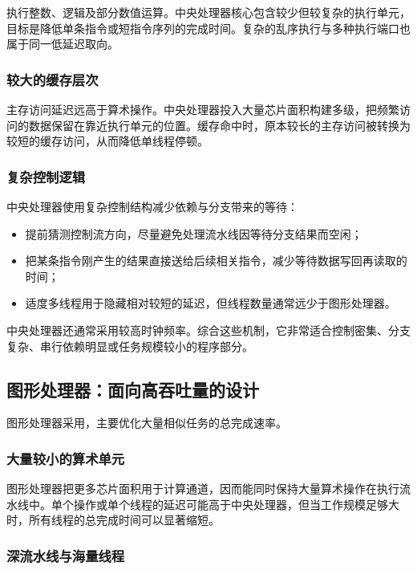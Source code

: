 执行整数、逻辑及部分数值运算。中央处理器核心包含较少但较复杂的执行单元，目标是降低单条指令或短指令序列的完成时间。复杂的乱序执行与多种执行端口也属于同一低延迟取向。

\subsubsection{较大的缓存层次}

主存访问延迟远高于算术操作。中央处理器投入大量芯片面积构建多级，把频繁访问的数据保留在靠近执行单元的位置。缓存命中时，原本较长的主存访问被转换为较短的缓存访问，从而降低单线程停顿。

\subsubsection{复杂控制逻辑}

中央处理器使用复杂控制结构减少依赖与分支带来的等待：
\begin{itemize}
  \item {}提前猜测控制流方向，尽量避免处理流水线因等待分支结果而空闲；
  \item {}把某条指令刚产生的结果直接送给后续相关指令，减少等待数据写回再读取的时间；
  \item 适度多线程用于隐藏相对较短的延迟，但线程数量通常远少于图形处理器。
\end{itemize}

中央处理器还通常采用较高时钟频率。综合这些机制，它非常适合控制密集、分支复杂、串行依赖明显或任务规模较小的程序部分。

\subsection{图形处理器：面向高吞吐量的设计}

图形处理器采用，主要优化大量相似任务的总完成速率。

\subsubsection{大量较小的算术单元}

图形处理器把更多芯片面积用于计算通道，因而能同时保持大量算术操作在执行流水线中。单个操作或单个线程的延迟可能高于中央处理器，但当工作规模足够大时，所有线程的总完成时间可以显著缩短。

\subsubsection{深流水线与海量线程}

